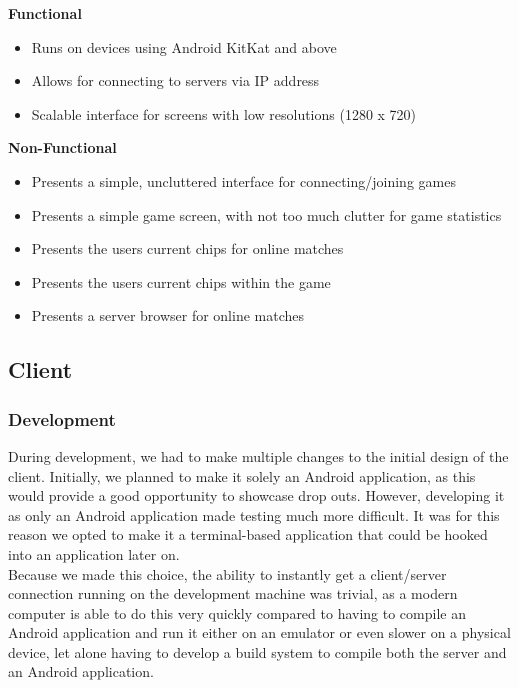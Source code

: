 \documentclass[11pt]{article}
\begin{document}
\textbf{Functional}
\begin{itemize}
	\item Runs on devices using Android KitKat and above
	\item Allows for connecting to servers via IP address
	\item Scalable interface for screens with low resolutions (1280 x 720)
\end{itemize}

\textbf{Non-Functional}
\begin{itemize}
	\item Presents a simple, uncluttered interface for connecting/joining games
	\item Presents a simple game screen, with not too much clutter for game statistics
	\item Presents the users current chips for online matches
	\item Presents the users current chips within the game
	\item Presents a server browser for online matches
\end{itemize}

\newpage



\subsection{Client}
\subsubsection{Development}

During development, we had to make multiple changes to the initial design of the client. Initially, we planned to make it solely an Android application, as this would provide a good opportunity to showcase drop outs. However, developing it as only an Android application made testing much more difficult. It was for this reason we opted to make it a terminal-based application that could be hooked into an application later on. \\

Because we made this choice, the ability to instantly get a client/server connection running on the development machine was trivial, as a modern computer is able to do this very quickly compared to having to compile an Android application and run it either on an emulator or even slower on a physical device, let alone having to develop a build system to compile both the server and an Android application. \\
\end{document}
